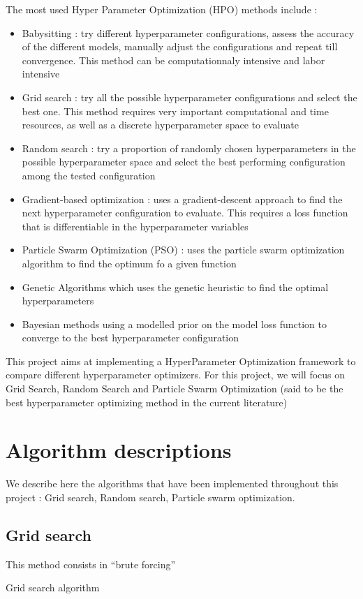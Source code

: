 \documentclass[a4 paper,11pt,2]{article}
\begin{document}
The most used Hyper Parameter Optimization (HPO) methods include : 
\begin{itemize}
\item Babysitting : try different hyperparameter configurations, assess the accuracy of the different models, manually adjust the configurations and repeat till convergence. This method can be computationnaly intensive and labor intensive
\item Grid search : try all the possible hyperparameter configurations and select the best one. This method requires very important computational and time resources, as well as a discrete hyperparameter space to evaluate
\item Random search : try a proportion of randomly chosen hyperparameters in the possible hyperparameter space and select the best performing configuration among the tested configuration
\item Gradient-based optimization : uses a gradient-descent approach to find the next hyperparameter configuration to evaluate. This requires a loss function that is differentiable in the hyperparameter variables
\item Particle Swarm Optimization (PSO) : uses the particle swarm optimization algorithm to find the optimum fo a given function
\item Genetic Algorithms which uses the genetic heuristic to find the optimal hyperparameters
\item Bayesian methods using a modelled prior on the model loss function to converge to the best hyperparameter configuration
\end{itemize}

This project aims at implementing a HyperParameter Optimization framework to compare different hyperparameter optimizers. For this project, we will focus on Grid Search, Random Search and Particle Swarm Optimization (said to be the best hyperparameter optimizing method in the current literature)

\section{Algorithm descriptions}
We describe here the algorithms that have been implemented throughout this project : Grid search, Random search, Particle swarm optimization.

\subsection{Grid search}
This method consists in ``brute forcing''
\begin{algorithm}
\caption{Grid search algorithm}
\end{algorithm}
\end{document}
